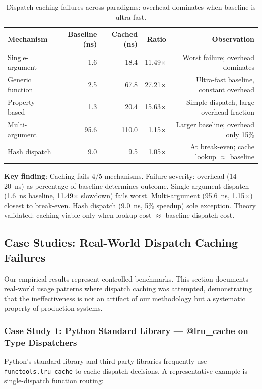 \documentclass[sigplan,final,acmsmall,review,screen]{acmart}
\begin{document}
\begin{table}[h!]
\centering
\small
\caption{Dispatch caching failures across paradigms: overhead dominates when baseline is ultra-fast.}
\label{tab:dispatch-mechanisms}
\begin{tabular}{@{}lrrrr@{}}
\toprule
\textbf{Mechanism} & \textbf{Baseline (ns)} & \textbf{Cached (ns)} & \textbf{Ratio} & \textbf{Observation} \\
\midrule
Single-argument & 1.6 & 18.4 & 11.49× & Worst failure; overhead dominates \\
Generic function & 2.5 & 67.8 & 27.21× & Ultra-fast baseline, constant overhead \\
Property-based & 1.3 & 20.4 & 15.63× & Simple dispatch, large overhead fraction \\
Multi-argument & 95.6 & 110.0 & 1.15× & Larger baseline; overhead only 15\% \\
Hash dispatch & 9.0 & 9.5 & 1.05× & At break-even; cache lookup $\approx$ baseline \\
\midrule
\end{tabular}
\end{table}

\textbf{Key finding}: Caching fails 4/5 mechanisms. Failure severity: overhead (14--20~ns) as percentage of baseline determines outcome. Single-argument dispatch (1.6~ns baseline, 11.49× slowdown) fails worst. Multi-argument (95.6~ns, 1.15×) closest to break-even. Hash dispatch (9.0~ns, 5\% speedup) sole exception. Theory validated: caching viable only when lookup cost $\approx$ baseline dispatch cost.

\subsection{Case Studies: Real-World Dispatch Caching Failures}
\label{sec:case-studies}

Our empirical results represent controlled benchmarks. This section documents real-world usage patterns where dispatch caching was attempted, demonstrating that the ineffectiveness is not an artifact of our methodology but a systematic property of production systems.

\subsubsection{Case Study 1: Python Standard Library — @lru\_cache on Type Dispatchers}

Python's standard library and third-party libraries frequently use \texttt{functools.lru\_cache} to cache dispatch decisions. A representative example is single-dispatch function routing:
\end{document}
